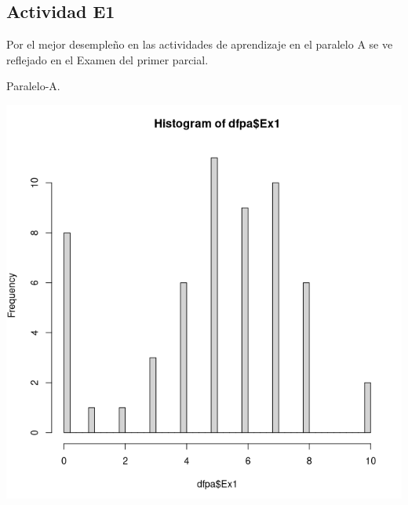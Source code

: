 \documentclass[a4pa<per,12pt,spanish]{article}
\begin{document}
\subsection{Actividad E1}
\label{sec:acctiviidad-e1}
Por el mejor desempleño en las actividades de aprendizaje en el paralelo A se ve reflejado en el Examen del primer parcial.\\



\begin{minipage}[h]{0.45\linewidth}
Paralelo-A.

\includegraphics[scale=0.3]{images/histoEx1.png}
\end{minipage}
\end{document}
